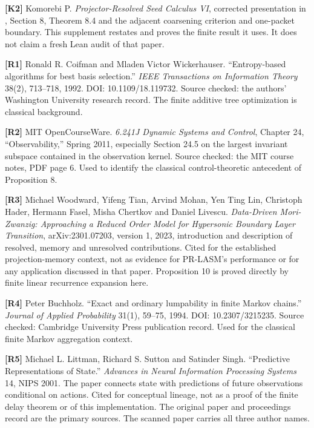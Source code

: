 \documentclass[11pt,oneside,openany]{book}
\numberwithin{equation}{section}
\begin{document}
\textbf{{[}K2{]}} Komorebi P. \emph{Projector-Resolved Seed Calculus
VI}, corrected presentation in
, Section 8, Theorem 8.4
and the adjacent coarsening criterion and one-packet boundary. This
supplement restates and proves the finite result it uses. It does not
claim a fresh Lean audit of that paper.

\textbf{{[}R1{]}} Ronald R. Coifman and Mladen Victor Wickerhauser.
``Entropy-based algorithms for best basis selection.'' \emph{IEEE
Transactions on Information Theory} 38(2), 713--718, 1992. DOI:
10.1109/18.119732. Source checked: the authors' Washington University
research record. The finite additive tree optimization is classical
background.

\textbf{{[}R2{]}} MIT OpenCourseWare. \emph{6.241J Dynamic Systems and
Control}, Chapter 24, ``Observability,'' Spring 2011, especially Section
24.5 on the largest invariant subspace contained in the observation
kernel. Source checked: the MIT course notes, PDF page 6. Used to
identify the classical control-theoretic antecedent of Proposition 8.

\textbf{{[}R3{]}} Michael Woodward, Yifeng Tian, Arvind Mohan, Yen Ting
Lin, Christoph Hader, Hermann Fasel, Misha Chertkov and Daniel Livescu.
\emph{Data-Driven Mori-Zwanzig: Approaching a Reduced Order Model for
Hypersonic Boundary Layer Transition}, arXiv:2301.07203, version 1,
2023, introduction and description of resolved, memory and unresolved
contributions. Cited for the established projection-memory context, not
as evidence for PR-LASM's performance or for any application discussed
in that paper. Proposition 10 is proved directly by finite linear
recurrence expansion here.

\textbf{{[}R4{]}} Peter Buchholz. ``Exact and ordinary lumpability in
finite Markov chains.'' \emph{Journal of Applied Probability} 31(1),
59--75, 1994. DOI: 10.2307/3215235. Source checked: Cambridge University
Press publication record. Used for the classical finite Markov
aggregation context.

\textbf{{[}R5{]}} Michael L. Littman, Richard S. Sutton and Satinder
Singh. ``Predictive Representations of State.'' \emph{Advances in Neural
Information Processing Systems} 14, NIPS 2001. The paper connects state
with predictions of future observations conditional on actions. Cited
for conceptual lineage, not as a proof of the finite delay theorem or of
this implementation. The original paper and proceedings record are the
primary sources. The scanned paper carries all three author names.
\end{document}
